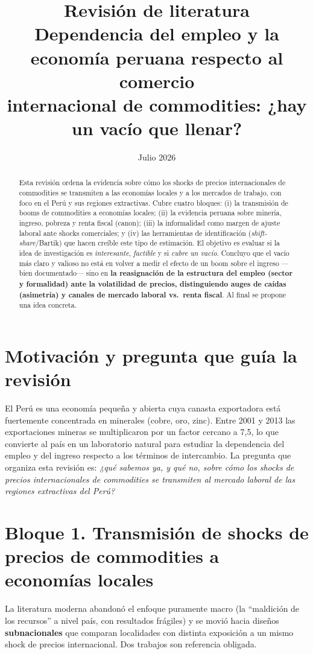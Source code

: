 \documentclass[11pt]{article}
\title{Revisión de literatura\\
\large Dependencia del empleo y la economía peruana respecto al comercio\\
internacional de commodities: ¿hay un vacío que llenar?}
\author{}
\date{Julio 2026}
\begin{document}
\maketitle

\begin{abstract}
\noindent Esta revisión ordena la evidencia sobre cómo los shocks de precios internacionales
de commodities se transmiten a las economías locales y a los mercados de trabajo, con foco
en el Perú y sus regiones extractivas. Cubre cuatro bloques: (i) la transmisión de booms de
commodities a economías locales; (ii) la evidencia peruana sobre minería, ingreso, pobreza y
renta fiscal (canon); (iii) la informalidad como margen de ajuste laboral ante shocks
comerciales; y (iv) las herramientas de identificación (\textit{shift-share}/Bartik) que
hacen creíble este tipo de estimación. El objetivo es evaluar si la idea de investigación es
\emph{interesante}, \emph{factible} y si \emph{cubre un vacío}. Concluyo que el vacío más
claro y valioso no está en volver a medir el efecto de un boom sobre el ingreso —bien
documentado— sino en \textbf{la reasignación de la estructura del empleo (sector y
formalidad) ante la volatilidad de precios, distinguiendo auges de caídas (asimetría) y
canales de mercado laboral vs.\ renta fiscal}. Al final se propone una idea concreta.
\end{abstract}

\section{Motivación y pregunta que guía la revisión}
El Perú es una economía pequeña y abierta cuya canasta exportadora está fuertemente
concentrada en minerales (cobre, oro, zinc). Entre 2001 y 2013 las exportaciones mineras se
multiplicaron por un factor cercano a 7,5, lo que convierte al país en un laboratorio natural
para estudiar la dependencia del empleo y del ingreso respecto a los términos de intercambio.
La pregunta que organiza esta revisión es: \emph{¿qué sabemos ya, y qué no, sobre cómo los
shocks de precios internacionales de commodities se transmiten al mercado laboral de las
regiones extractivas del Perú?}

\section{Bloque 1. Transmisión de shocks de precios de commodities a economías locales}

La literatura moderna abandonó el enfoque puramente macro (la ``maldición de los recursos''
a nivel país, con resultados frágiles) y se movió hacia diseños \textbf{subnacionales} que
comparan localidades con distinta exposición a un mismo shock de precios internacional. Dos
trabajos son referencia obligada.
\end{document}
